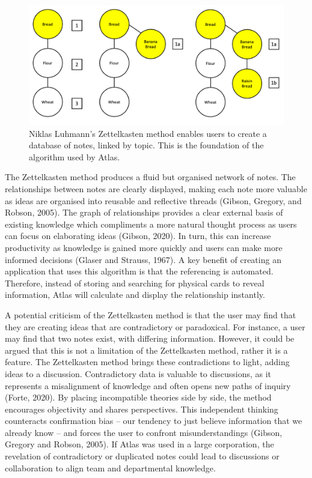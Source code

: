 \documentclass{article}
\begin{document}
\begin{figure}[!htb]
  \centering
      \includegraphics[width=1\textwidth]{images/litreview-zettelkasten.png}
  \caption{Niklas Luhmann’s Zettelkasten method enables users to create a database of notes, linked by topic. This is the foundation of the algorithm used by Atlas.}
  \label{fig:zettelkasten}
\end{figure}

The  Zettelkasten method produces a fluid but organised network of notes. The relationships between notes are clearly displayed, making each note more valuable as ideas are organised into reusable and reflective threads (Gibson, Gregory, and Robson, 2005). The graph of relationships provides a clear external basis of existing knowledge which compliments a more natural thought process as users can focus on elaborating ideas (Gibson, 2020). In turn, this can increase productivity as knowledge is gained more quickly and users can make more informed decisions (Glaser and Strauss, 1967). A key benefit of creating an application that uses this algorithm is that the referencing is automated. Therefore, instead of storing and searching for physical cards to reveal information, Atlas will calculate and display the relationship instantly.

A potential criticism of the Zettelkasten method is that the user may find that they are creating ideas that are contradictory or paradoxical. For instance, a user may find that two notes exist, with differing information. However, it could be argued that this is not a limitation of the Zettelkasten method, rather it is a feature. The Zettelkasten method brings these contradictions to light, adding ideas to a discussion. Contradictory data is valuable to discussions, as it represents a misalignment of knowledge and often opens new paths of inquiry (Forte, 2020). By placing incompatible theories side by side, the method encourages objectivity and shares perspectives. This independent thinking counteracts confirmation bias – our tendency to just believe information that we already know – and forces the user to confront misunderstandings (Gibson, Gregory and Robson, 2005). If Atlas was used in a large corporation, the revelation of contradictory or duplicated notes could lead to discussions or collaboration to align team and departmental knowledge.
\end{document}
